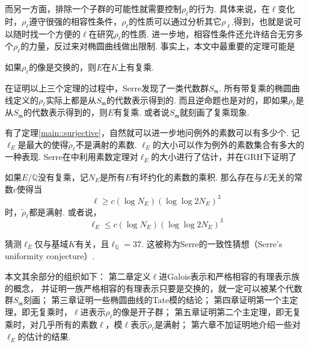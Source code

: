 而另一方面，排除一个子群的可能性就需要控制$\rho_{\ell}$的行为. 具体来说，在$\ell$变化时，$\rho_{\ell}$遵守很强的相容性条件，$\rho_{\ell}$的性质可以通过分析其它$\rho_{\ell'}$得到，也就是说可以随时找一个方便的$\ell$在研究$\rho_{\ell}$的性质. 进一步地，相容性条件还允许结合无穷多个$\rho_{\ell}$的力量，反过来对椭圆曲线做出限制. 事实上，本文中最重要的定理可能是

\begin{cthm}
    如果$\rho_{\ell}$的像是交换的，则$E$在$K$上有复乘.
\end{cthm}

在证明以上三个定理的过程中，Serre发现了一类代数群$S_{\mathfrak{m}}$. 所有带复乘的椭圆曲线定义的$\rho_{\ell}$实际上都是从$S_{\mathfrak{m}}$的代数表示得到的. 而且逆命题也是对的，即如果$\rho_{\ell}$是从$S_{\mathfrak{m}}$的代数表示得到的，则$E$有复乘. 或者说$S_{\mathfrak{m}}$就刻画了复乘现象.

有了定理\ref{main::surjective}，自然就可以进一步地问例外的素数可以有多少个.
记$\ell_{E}$是最大的使得$\tilde{\rho}_{\ell}$不是满射的素数.
$\ell_{E}$的大小可以作为例外的素数集合有多大的一种表现.
Serre在\parencite{serre1981quelques}中利用素数定理对$\ell_{E}$的大小进行了估计，并在GRH下证明了
\begin{cthm}
    如果$E/\mathbb{Q}$没有复乘，记$N_E$是所有$E$有坏约化的素数的乘积. 那么存在与$E$无关的常数$c$使得当
    \begin{equation}
        \ell \geq c(\log N_E)(\log\log 2N_E)^3
    \end{equation}
    时，$\tilde{\rho}_{\ell}$都是满射. 或者说，
    \begin{equation}
        \ell_{E} \leq c(\log N_E)(\log \log 2N_E)^3
    \end{equation}
\end{cthm}

猜测$\ell_{E}$仅与基域$K$有关，且$\ell_{\mathbb{Q}}=37$.
这被称为Serre的一致性猜想（Serre's uniformity conjecture）.

本文其余部分的组织如下：
第二章定义$\ell$进Galois表示和严格相容的有理表示族的概念，
并证明一族严格相容的有理表示只要是交换的，就一定可以被某个代数群$S_{\mathfrak{m}}$刻画；
第三章证明一些椭圆曲线的Tate模的结论；
第四章证明第一个主定理，即无复乘时，$\ell$进表示$\rho_{\ell}$的像是开子群；
第五章证明第二个主定理，即无复乘时，对几乎所有的素数$\ell$，模$\ell$表示$\tilde{\rho}_{\ell}$是满射；
第六章不加证明地介绍一些对$\ell_{E}$的估计的结果.
